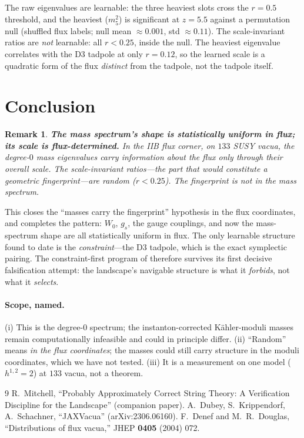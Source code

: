 \documentclass[11pt]{article}
\newtheorem{remark}{Remark}
\begin{document}
The raw eigenvalues are learnable: the three heaviest slots cross the
$r = 0.5$ threshold, and the heaviest ($m^2_5$) is significant at $z = 5.5$
against a permutation null (shuffled flux labels; null mean $\approx 0.001$,
std $\approx 0.11$). The scale-invariant ratios are \emph{not} learnable: all
$r < 0.25$, inside the null. The heaviest eigenvalue correlates with the D3
tadpole at only $r = 0.12$, so the learned scale is a quadratic form of the flux
\emph{distinct} from the tadpole, not the tadpole itself.

\section{Conclusion}

\begin{remark}
\textbf{The mass spectrum's shape is statistically uniform in flux; its scale is
flux-determined.} In the IIB flux corner, on $133$ SUSY vacua, the degree-$0$
mass eigenvalues carry information about the flux only through their overall
scale. The scale-invariant ratios---the part that would constitute a geometric
fingerprint---are random ($r < 0.25$). The fingerprint is not in the mass
spectrum.
\end{remark}

This closes the ``masses carry the fingerprint'' hypothesis in the flux
coordinates, and completes the pattern: $W_0$, $g_s$, the gauge couplings, and now
the mass-spectrum shape are all statistically uniform in flux. The only learnable
structure found to date is the \emph{constraint}---the D3 tadpole, which is the
exact symplectic pairing. The constraint-first program of \cite{pacland} therefore
survives its first decisive falsification attempt: the landscape's navigable
structure is what it \emph{forbids}, not what it \emph{selects}.

\paragraph{Scope, named.} (i) This is the degree-$0$ spectrum; the
instanton-corrected K\"ahler-moduli masses remain computationally infeasible and
could in principle differ. (ii) ``Random'' means \emph{in the flux coordinates};
the masses could still carry structure in the moduli coordinates, which we have
not tested. (iii) It is a measurement on one model ($h^{1,2}=2$) at
$133$ vacua, not a theorem.

\begin{thebibliography}{9}
 R.~Mitchell, ``Probably Approximately Correct String Theory:
A Verification Discipline for the Landscape'' (companion paper).
 A.~Dubey, S.~Krippendorf, A.~Schachner, ``JAXVacua''
(arXiv:2306.06160).
 F.~Denef and M.~R.~Douglas, ``Distributions of flux vacua,''
JHEP \textbf{0405} (2004) 072.
\end{thebibliography}
\end{document}
